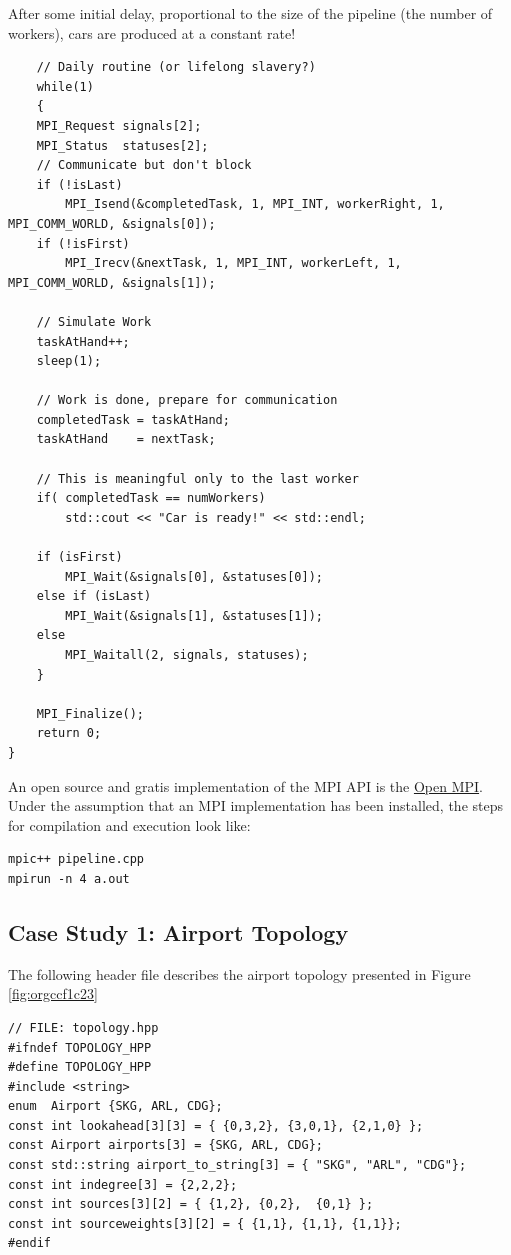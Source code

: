 \documentclass[11pt]{article}
\begin{document}
After some initial delay, proportional to the size of the pipeline (the number of workers), cars are produced at a constant rate!
\begin{verbatim}
    // Daily routine (or lifelong slavery?)
    while(1)
    {
	MPI_Request signals[2];
	MPI_Status  statuses[2];
	// Communicate but don't block
	if (!isLast)
	    MPI_Isend(&completedTask, 1, MPI_INT, workerRight, 1, MPI_COMM_WORLD, &signals[0]);
	if (!isFirst)
	    MPI_Irecv(&nextTask, 1, MPI_INT, workerLeft, 1, MPI_COMM_WORLD, &signals[1]);

	// Simulate Work
	taskAtHand++;
	sleep(1);

	// Work is done, prepare for communication
	completedTask = taskAtHand;
	taskAtHand    = nextTask;

	// This is meaningful only to the last worker
	if( completedTask == numWorkers)
	    std::cout << "Car is ready!" << std::endl;

	if (isFirst)
	    MPI_Wait(&signals[0], &statuses[0]);
	else if (isLast)
	    MPI_Wait(&signals[1], &statuses[1]);
	else
	    MPI_Waitall(2, signals, statuses);
    }

    MPI_Finalize();
    return 0;
}
\end{verbatim}


An open source and gratis implementation of the MPI API is the \href{https://www.open-mpi.org/}{Open MPI}.
Under the assumption that an MPI implementation has been installed, the steps for compilation and execution look like:
\begin{verbatim}
mpic++ pipeline.cpp
mpirun -n 4 a.out
\end{verbatim}

\clearpage

\subsection{Case Study 1: Airport Topology}
\label{AppendixC}

The following header file describes the airport topology presented in Figure \ref{fig:orgccf1c23}
\begin{verbatim}
// FILE: topology.hpp
#ifndef TOPOLOGY_HPP
#define TOPOLOGY_HPP
#include <string>
enum  Airport {SKG, ARL, CDG};
const int lookahead[3][3] = { {0,3,2}, {3,0,1}, {2,1,0} };
const Airport airports[3] = {SKG, ARL, CDG};
const std::string airport_to_string[3] = { "SKG", "ARL", "CDG"};
const int indegree[3] = {2,2,2};
const int sources[3][2] = { {1,2}, {0,2},  {0,1} };
const int sourceweights[3][2] = { {1,1}, {1,1}, {1,1}};
#endif
\end{verbatim}
\end{document}
